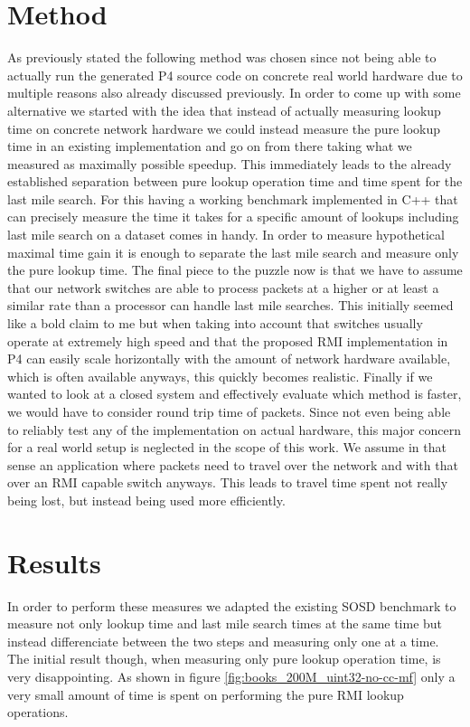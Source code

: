 \section{Method}
As previously stated the following method was chosen since not being able to actually run the generated P4 source code on concrete real world hardware due to multiple reasons also already discussed previously. In order to come up with some alternative we started with the idea that instead of actually measuring lookup time on concrete network hardware we could instead measure the pure lookup time in an existing implementation and go on from there taking what we measured as maximally possible speedup. This immediately leads to the already established separation between pure lookup operation time and time spent for the last mile search. For this having a working benchmark implemented in C++ that can precisely measure the time it takes for a specific amount of lookups including last mile search on a dataset comes in handy. In order to measure hypothetical maximal time gain it is enough to separate the last mile search and measure only the pure lookup time. The final piece to the puzzle now is that we have to assume that our network switches are able to process packets at a higher or at least a similar rate than a processor can handle last mile searches. This initially seemed like a bold claim to me but when taking into account that switches usually operate at extremely high speed and that the proposed RMI implementation in P4 can easily scale horizontally with the amount of network hardware available, which is often available anyways, this quickly becomes realistic. Finally if we wanted to look at a closed system and effectively evaluate which method is faster, we would have to consider round trip time of packets. Since not even being able to reliably test any of the implementation on actual hardware, this major concern for a real world setup is neglected in the scope of this work. We assume in that sense an application where packets need to travel over the network and with that over an RMI capable switch anyways. This leads to travel time spent not really being lost, but instead being used more efficiently.

\section{Results}
\label{sect:measurements:results}
In order to perform these measures we adapted the existing SOSD benchmark to measure not only lookup time and last mile search times at the same time but instead differenciate between the two steps and measuring only one at a time. The initial result though, when measuring only pure lookup operation time, is very disappointing. As shown in figure \ref{fig:books_200M_uint32-no-cc-mf} only a very small amount of time is spent on performing the pure RMI lookup operations.


